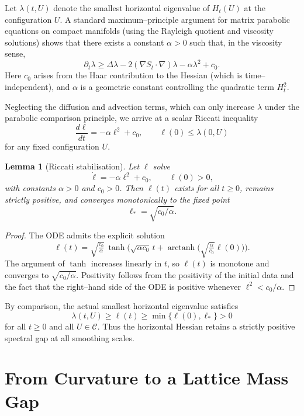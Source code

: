 \documentclass[11pt]{article}
\newtheorem{lemma}[theorem]{Lemma}
\begin{document}
Let $\lambda(t,U)$ denote the smallest horizontal eigenvalue of $H_t(U)$
at the configuration $U$.  A standard maximum--principle argument for
matrix parabolic equations on compact manifolds (using the Rayleigh
quotient and viscosity solutions) shows that there exists a constant
$\alpha>0$ such that, in the viscosity sense,
\begin{equation}
  \partial_t \lambda
  \ge \Delta\lambda - 2(\nabla S_t\cdot\nabla)\lambda
    - \alpha\lambda^2 + c_0.
\end{equation}
Here $c_0$ arises from the Haar contribution to the Hessian (which is
time--independent), and $\alpha$ is a geometric constant controlling the
quadratic term $H_t^2$.

Neglecting the diffusion and advection terms, which can only increase
$\lambda$ under the parabolic comparison principle, we arrive at a
scalar Riccati inequality
\begin{equation}
  \frac{d\ell}{dt} = -\alpha\ell^2 + c_0,
  \qquad \ell(0)\le \lambda(0,U)
\end{equation}
for any fixed configuration $U$.

\begin{lemma}[Riccati stabilisation]
Let $\ell$ solve
\[
  \dot\ell = -\alpha\ell^2 + c_0, \qquad \ell(0)>0,
\]
with constants $\alpha>0$ and $c_0>0$.  Then $\ell(t)$ exists for all
$t\ge 0$, remains strictly positive, and converges monotonically to the
fixed point
\[
  \ell_* = \sqrt{c_0/\alpha}.
\]
\end{lemma}

\begin{proof}
The ODE admits the explicit solution
\[
  \ell(t)
  = \sqrt{\tfrac{c_0}{\alpha}}\,
    \tanh\Big(\sqrt{\alpha c_0}\,t
      + \operatorname{arctanh}\big(\sqrt{\tfrac{\alpha}{c_0}}\ell(0)\big)
      \Big).
\]
The argument of $\tanh$ increases linearly in $t$, so $\ell(t)$ is
monotone and converges to $\sqrt{c_0/\alpha}$.  Positivity follows from
the positivity of the initial data and the fact that the right--hand
side of the ODE is positive whenever $\ell^2<c_0/\alpha$.
\end{proof}

By comparison, the actual smallest horizontal eigenvalue satisfies
\[
  \lambda(t,U) \ge \ell(t) \ge \min\{\ell(0),\ell_*\} > 0
\]
for all $t\ge 0$ and all $U\in\mathcal{C}$.  Thus the horizontal Hessian
retains a strictly positive spectral gap at all smoothing scales.

\section{From Curvature to a Lattice Mass Gap}
\end{document}
